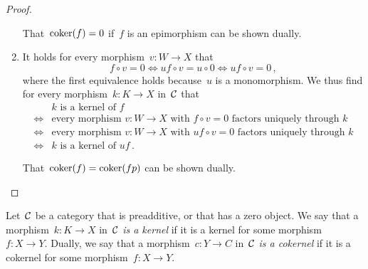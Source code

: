 \begin{proof}
\begin{enumerate}
      That~$\operatorname{coker}(f) = 0$ if~$f$ is an epimorphism can be shown dually.
    \item
      It holds for every morphism~$v \colon W \to X$ that
      \[
              f \circ v = 0
        \iff  uf \circ v = u \circ 0
        \iff  uf \circ v = 0 \,,
      \]
      where the first equivalence holds because~$u$ is a monomorphism.
      We thus find for every morphism~$k \colon K \to X$ in~$\mathcal{C}$ that
      \begin{align*}
            {}& \text{$k$ is a kernel of~$f$} \\
        \iff{}& \text{every morphism~$v \colon W \to X$ with~$f \circ v = 0$ factors uniquely through~$k$}  \\
        \iff{}& \text{every morphism~$v \colon W \to X$ with~$uf \circ v = 0$ factors uniquely through~$k$} \\
        \iff{}& \text{$k$ is a kernel of~$uf$} \,.
      \end{align*}
      
      That~$\operatorname{coker}(f) = \operatorname{coker}(fp)$ can be shown dually.
    \qedhere
  \end{enumerate}
\end{proof}


\begin{notation*}
  Let~$\mathcal{C}$ be a category that is preadditive, or that has a zero object.
  We say that a morphism~$k \colon K \to X$ in~$\mathcal{C}$ \emph{is a kernel} if it is a kernel for some morphism~$f \colon X \to Y$.
  Dually, we say that a morphism~$c \colon Y \to C$ in~$\mathcal{C}$ \emph{is a cokernel} if it is a cokernel for some morphism~$f \colon X \to Y$.
\end{notation*}


